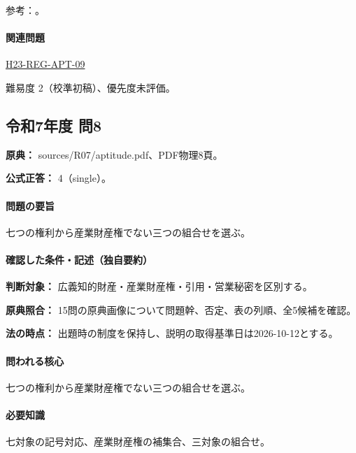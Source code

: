 \par 参考：\cite{ip_industrial_four,ip_broad_scope}。

\paragraph{関連問題} \hyperref[q:h23-reg-apt-09]{H23-REG-APT-09}

\par 難易度 2（校準初稿）、優先度未評価。

\subsection{令和7年度 問8}
\label{q:r07-reg-apt-08}

\noindent\textbf{原典：} sources/R07/aptitude.pdf、PDF物理8頁。

\textbf{公式正答：} 4（single）。

\paragraph{問題の要旨} 七つの権利から産業財産権でない三つの組合せを選ぶ。

\paragraph{確認した条件・記述（独自要約）}\mbox{}\par

\noindent\textbf{判断対象：} 広義知的財産・産業財産権・引用・営業秘密を区別する。\par

\noindent\textbf{原典照合：} 15問の原典画像について問題幹、否定、表の列順、全5候補を確認。\par

\noindent\textbf{法の時点：} 出題時の制度を保持し、説明の取得基準日は2026-10-12とする。\par

\paragraph{問われる核心} 七つの権利から産業財産権でない三つの組合せを選ぶ。

\paragraph{必要知識} 七対象の記号対応、産業財産権の補集合、三対象の組合せ。

